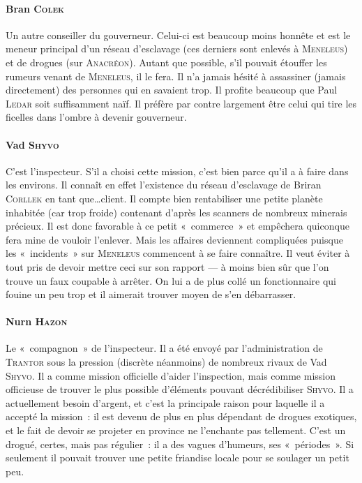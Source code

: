 {\paragraph{Bran \textsc{Colek}}
{
Un autre conseiller du gouverneur.
Celui-ci est beaucoup moins honnête et est le meneur principal d’un réseau d’esclavage (ces derniers sont enlevés à \textsc{Meneleus}) et de drogues (sur \textsc{Anacréon}).
Autant que possible, s’il pouvait étouffer les rumeurs venant de \textsc{Meneleus}, il le fera.
Il n’a jamais hésité à assassiner (jamais directement) des personnes qui en savaient trop.
Il profite beaucoup que Paul \textsc{Ledar} soit suffisamment naïf.
Il préfère par contre largement être celui qui tire les ficelles dans l’ombre à devenir gouverneur.
}

\paragraph{Vad \textsc{Shyvo}}
{
C’est l’inspecteur.
S’il a choisi cette mission, c’est bien parce qu’il a à faire dans les environs.
Il connaît en effet l’existence du réseau d’esclavage de Briran \textsc{Corllek} en tant que\ldots client.
Il compte bien rentabiliser une petite planète inhabitée (car trop froide) contenant d’après les scanners de nombreux minerais précieux.
Il est donc favorable à ce petit «~commerce~» et empêchera quiconque fera mine de vouloir l’enlever.
Mais les affaires deviennent compliquées puisque les «~incidents~» sur \textsc{Meneleus} commencent à se faire connaître.
Il veut éviter à tout pris de devoir mettre ceci sur son rapport — à moins bien sûr que l’on trouve un faux coupable à arrêter.
On lui a de plus collé un fonctionnaire qui fouine un peu trop et il aimerait trouver moyen de s’en débarrasser.
}

\paragraph{Nurn \textsc{Hazon}}
{
Le «~compagnon~» de l’inspecteur.
Il a été envoyé par l’administration de \textsc{Trantor} sous la pression (discrète néanmoins) de nombreux rivaux de Vad \textsc{Shyvo}.
Il a comme mission officielle d’aider l’inspection, mais comme mission officieuse de trouver le plus possible d’éléments pouvant décrédibiliser \textsc{Shyvo}.
Il a actuellement besoin d’argent, et c’est la principale raison pour laquelle il a accepté la mission~: il est devenu de plus en plus dépendant de drogues exotiques, et le fait de devoir se projeter en province ne l’enchante pas tellement. C’est un drogué, certes, mais pas régulier~: il a des vagues d’humeurs, ses «~périodes~».
Si seulement il pouvait trouver une petite friandise locale pour se soulager un petit peu.
}

}
